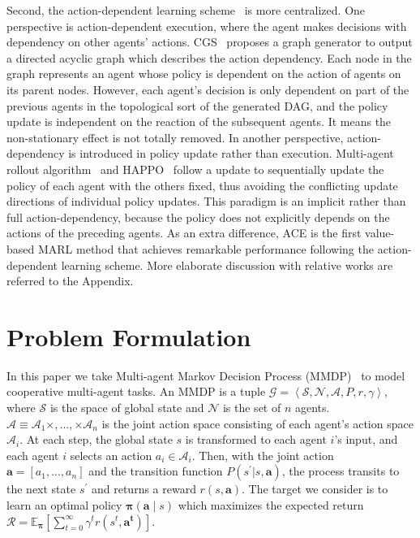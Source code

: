 \documentclass[letterpaper]{article} \usepackage{aaai23}  \usepackage{times}  \usepackage{helvet}  \usepackage{courier}  \usepackage[hyphens]{url}  \usepackage{graphicx} \urlstyle{rm} \def\UrlFont{\rm}  \usepackage{natbib}  \usepackage{caption} \frenchspacing  \setlength{\pdfpagewidth}{8.5in} \setlength{\pdfpageheight}{11in} \usepackage{algorithm}
\begin{document}
Second, the action-dependent learning scheme~\citeyear{multiagent_rollout,happo,gcs,kuba2021settling, ye2022towards, kuba2022heterogeneous, fu2022revisiting} is more centralized. One perspective is action-dependent execution, where the agent makes decisions with dependency on other agents’ actions. CGS~\citeyear{gcs} proposes a graph generator to output a directed acyclic graph which describes the action dependency. Each node in the graph represents an agent whose policy is dependent on the action of agents on its parent nodes. However, each agent's decision is only dependent on part of the previous agents in the topological sort of the generated DAG, and the policy update is independent on the reaction of the subsequent agents. It means the non-stationary effect is not totally removed. In another perspective, action-dependency is introduced in policy update rather than execution. Multi-agent rollout algorithm~\citeyear{multiagent_rollout} and HAPPO~\citeyear{happo} follow a update to sequentially update the policy of each agent with the others fixed, thus avoiding the conflicting update directions of individual policy updates. This paradigm is an implicit rather than full action-dependency, because the policy does not explicitly depends on the actions of the preceding agents.
As an extra difference, ACE is the first value-based MARL method that achieves remarkable performance following the action-dependent learning scheme. More elaborate discussion with relative works are referred to the Appendix.


 \vspace{-1ex}
\section{Problem Formulation}
\vspace{-0.5ex}
In this paper we take Multi-agent Markov Decision Process (MMDP)~\citeyear{markov} to model cooperative multi-agent tasks. An MMDP is a tuple 
$\mathcal{G}=\left\langle \mathcal{S}, \mathcal{N}, \mathcal{A}, P, r, \gamma \right\rangle$, where $\mathcal{S}$ is the space of global state and $\mathcal{N}$ is the set of $n$ agents. $\mathcal{A}\equiv \mathcal{A}_1 \times, ..., \times \mathcal{A}_n $ is the joint action space consisting of each agent's action space $\mathcal{A}_i$. At each step, the global state $s$ is transformed to each agent $i$'s input, and each agent $i$ selects an action $a_i \in \mathcal{A}_i$. Then, with the joint action $\boldsymbol{a}=\left[a_1,...,a_n\right]$ and the transition function $P\left(s^{\prime}|s,\boldsymbol{a}\right)$, the process transits to the next state $s^{\prime}$ and returns a reward $r\left(s,\boldsymbol{a}\right)$. The target we consider is to learn an optimal policy $\boldsymbol{\pi}\left(\boldsymbol{a} \mid s\right)$ which maximizes the expected return $\mathcal{R} = \mathbb{E}_{\boldsymbol{\pi}}\left[\sum_{t=0}^{\infty} \gamma^t r\left(s^t,\boldsymbol{a^t}\right)\right]$.
\end{document}
